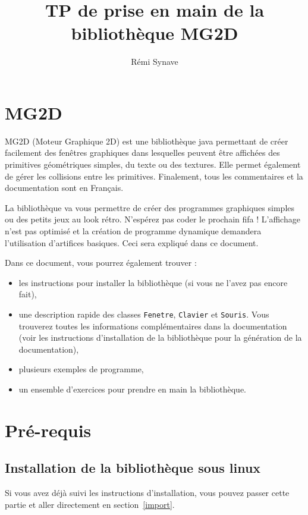 \documentclass[12pt]{exam}
\title{TP de prise en main de la bibliothèque MG2D}
\author{Rémi Synave}
\date{}
\begin{document}
\maketitle
\tableofcontents

\newpage

\section{MG2D}
MG2D (Moteur Graphique 2D) est une bibliothèque java permettant de créer facilement des fenêtres graphiques dans lesquelles peuvent être affichées des primitives géométriques simples, du texte ou des textures. Elle permet également de gérer les collisions entre les primitives. Finalement, tous les commentaires et la documentation sont en Français.

La bibliothèque va vous permettre de créer des programmes graphiques simples ou des petits jeux au look rétro. N'espérez pas coder le prochain fifa ! L'affichage n'est pas optimisé et la création de programme dynamique demandera l'utilisation d'artifices basiques. Ceci sera expliqué dans ce document.

Dans ce document, vous pourrez également trouver :
\begin{itemize}
\item les instructions pour installer la bibliothèque (si vous ne l'avez pas encore fait),
\item une description rapide des classes \texttt{Fenetre}, \texttt{Clavier} et \texttt{Souris}. Vous trouverez toutes les informations complémentaires dans la documentation (voir les instructions d'installation de la bibliothèque pour la génération de la documentation),
\item plusieurs exemples de programme,
\item un ensemble d'exercices pour prendre en main la bibliothèque.
\end{itemize}

\section{Pré-requis}
\subsection{Installation de la bibliothèque sous linux}
\label{install}
Si vous avez déjà suivi les instructions d'installation, vous pouvez passer cette partie et aller directement en section~\ref{import}.
\end{document}
